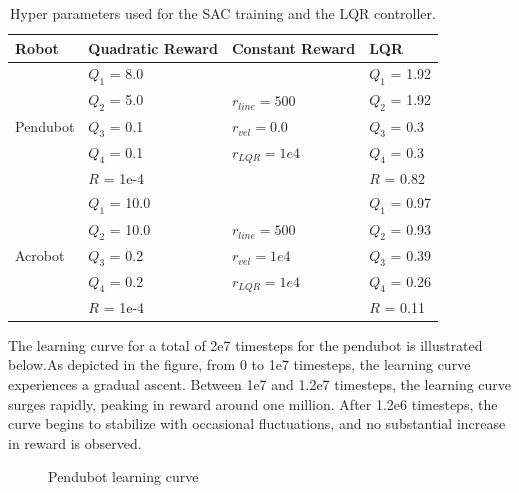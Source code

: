 \begin{table}[H]
  \centering
  \begin{tabular}{p{2cm} | p{3cm} | p{3cm} | p{3cm}}
  Robot & Quadratic Reward  & Constant Reward & LQR\\
  \hline
  \multirow{5}{*}{Pendubot} & \(Q_1\) = 8.0  &  & \(Q_1\) = 1.92\\
  & \(Q_2\) = 5.0  & \(r_{line}=500\) & \(Q_2\) = 1.92\\
  & \(Q_3\) = 0.1  & \(r_{vel}=0.0\) & \(Q_3\) = 0.3\\
  & \(Q_4\) = 0.1  & \(r_{LQR}=1e4\)& \(Q_4\) = 0.3\\
  & \(R\) = 1e-4  & & \(R\) = 0.82\\
  \hline
  \multirow{5}{*}{Acrobot} & \(Q_1\) = 10.0  &  & \(Q_1\) = 0.97\\
  & \(Q_2\) = 10.0  & \(r_{line}=500\) & \(Q_2\) = 0.93\\
  & \(Q_3\) = 0.2  & \(r_{vel}=1e4\) & \(Q_3\) = 0.39\\
  & \(Q_4\) = 0.2  & \(r_{LQR}=1e4\) & \(Q_4\) = 0.26\\
  & \(R\) = 1e-4  &  & \(R\) = 0.11\\
  \end{tabular}
 \caption{Hyper parameters used for the SAC training and the LQR controller.}
 \label{tab:parameters}
\end{table}

The learning curve for a total of 2e7 timesteps for the pendubot is illustrated below.As depicted in the figure, from 0 to 1e7 timesteps, the learning curve experiences a gradual ascent. Between 1e7 and 1.2e7 timesteps, the learning curve surges rapidly, peaking in reward around one million. After 1.2e6 timesteps, the curve begins to stabilize with occasional fluctuations, and no substantial increase in reward is observed.

\begin{figure}[H]
    \centering
    \caption{Pendubot learning curve}
    \label{fig:image_a}
\end{figure}

